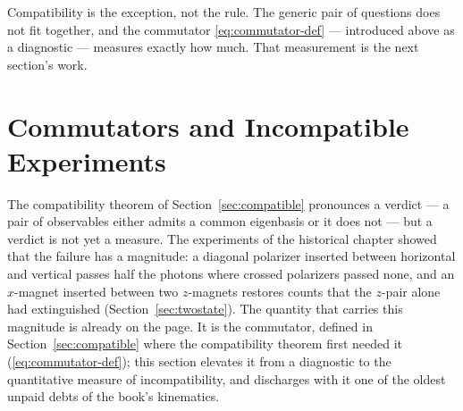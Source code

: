 Compatibility is the exception, not the rule. The generic pair of questions does not fit together, and the commutator \eqref{eq:commutator-def} --- introduced above as a diagnostic --- measures exactly how much. That measurement is the next section's work.

\section{Commutators and Incompatible Experiments}
\label{sec:commutators}

The compatibility theorem of Section~\ref{sec:compatible} pronounces a verdict --- a pair of observables either admits a common eigenbasis or it does not --- but a verdict is not yet a measure. The experiments of the historical chapter showed that the failure has a magnitude: a diagonal polarizer inserted between horizontal and vertical passes half the photons where crossed polarizers passed none, and an $x$-magnet inserted between two $z$-magnets restores counts that the $z$-pair alone had extinguished (Section~\ref{sec:twostate}). The quantity that carries this magnitude is already on the page. It is the commutator, defined in Section~\ref{sec:compatible} where the compatibility theorem first needed it (\eqref{eq:commutator-def}); this section elevates it from a diagnostic to the quantitative measure of incompatibility, and discharges with it one of the oldest unpaid debts of the book's kinematics.

